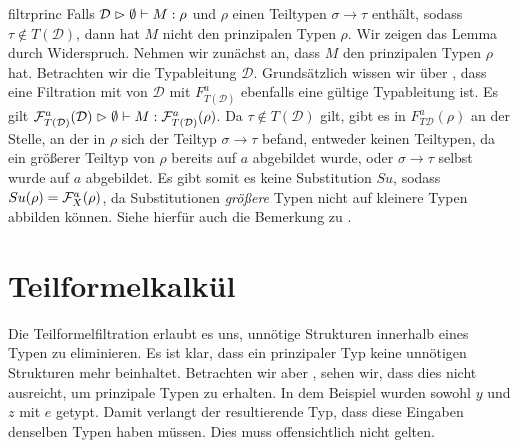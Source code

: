 \begin{lemma}{}{filtrprinc}
    Falls $\mathcal{D}\vartriangleright\emptyset\vdash M : \rho$ und $\rho$ einen Teiltypen $\sigma\to\tau$ enthält, sodass $\tau\notin T(\mathcal{D})$, dann hat $M$ nicht den prinzipalen Typen $\rho$.
    \Proof
    Wir zeigen das Lemma durch Widerspruch. Nehmen wir zunächst an, dass $M$ den prinzipalen Typen $\rho$ hat. Betrachten wir die Typableitung $\mathcal{D}$. Grundsätzlich wissen wir über , dass eine Filtration mit von $\mathcal{D}$ mit $F^a_{T(\mathcal{D})}$ ebenfalls eine gültige Typableitung ist. Es gilt $\mathcal{F}^a_{T(\mathcal{D})}(\mathcal{D})\vartriangleright\emptyset\vdash M : \mathcal{F}^a_{T(\mathcal{D})}(\rho)$. Da $\tau\notin T(\mathcal{D})$ gilt, gibt es in $F^a_{T\mathcal{D}}(\rho)$ an der Stelle, an der in $\rho$ sich der Teiltyp $\sigma\to\tau$ befand, entweder keinen Teiltypen, da ein größerer Teiltyp von $\rho$ bereits auf $a$ abgebildet wurde, oder $\sigma\to\tau$ selbst wurde auf $a$ abgebildet.
    Es gibt somit es keine Substitution $Su$, sodass $Su(\rho) = \mathcal{F}^a_X(\rho)$, da Substitutionen \emph{größere} Typen nicht auf kleinere Typen abbilden können. Siehe hierfür auch die Bemerkung zu .
\end{lemma}

\section{Teilformelkalkül}
\label{sec:SfC}

Die Teilformelfiltration erlaubt es uns, unnötige Strukturen innerhalb eines Typen zu eliminieren. Es ist klar, dass ein prinzipaler Typ keine unnötigen Strukturen mehr beinhaltet. Betrachten wir aber , sehen wir, dass dies nicht ausreicht, um prinzipale Typen zu erhalten. In dem Beispiel wurden sowohl $y$ und $z$ mit $e$ getypt. Damit verlangt der resultierende Typ, dass diese Eingaben denselben Typen haben müssen. Dies muss offensichtlich nicht gelten. 

